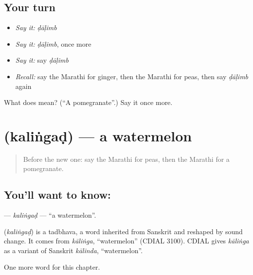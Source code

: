 \subsection*{Your turn}
\begin{itemize}
\raggedright
  \item \emph{Say it:} \emph{ḍāḷimb}
  \item \emph{Say it:} \emph{ḍāḷimb}, once more
  \item \emph{Say it:} say \emph{ḍāḷimb}
  \item \emph{Recall:} say the Marathi for ginger, then the Marathi for peas, then say \emph{ḍāḷimb} again
\end{itemize}

\begin{tcolorbox}[breakable,colback=teal!4,colframe=teal!35!black,title={Before you move on}]
What does  mean? (\textquotedblleft{}A pomegranate\textquotedblright{}.) Say it once more.
\end{tcolorbox}
\section[\texorpdfstring{\mr{कलिंगड} (kaliṅgaḍ)}{कलिंगड (kaliṅgaḍ)}]{ (kaliṅgaḍ) — a watermelon}

\label{lesson:MR-C138-kalingad}



\begin{quote}
Before the new one: say the Marathi for peas, then the Marathi for a pomegranate.
\end{quote}

\subsection*{You'll want to know: }
\textbf{} — \emph{kaliṅgaḍ} — \textquotedblleft{}a watermelon\textquotedblright{}.

\begin{cousinweb}
\textbf{} (\emph{kaliṅgaḍ}) is a tadbhava, a word inherited from Sanskrit and reshaped by sound change. It comes from \emph{kāliṅga}, \textquotedblleft{}watermelon\textquotedblright{} (CDIAL 3100). CDIAL gives \emph{kāliṅga} as a variant of Sanskrit \emph{kālinda}, \textquotedblleft{}watermelon\textquotedblright{}.
\end{cousinweb}

\begin{grammarlens}[title={What you've built}]
One more word for this chapter.
\end{grammarlens}

